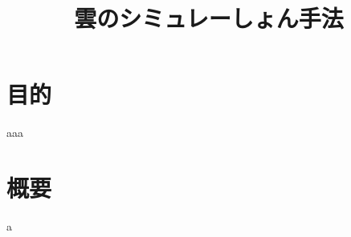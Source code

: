 \documentclass{ujarticle}
\title{雲のシミュレーしょん手法}
\begin{document}
\maketitle
\section{目的}
aaa
\section{概要}
a
\end{document}
